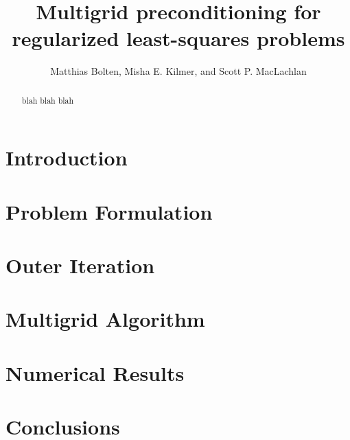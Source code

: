 \documentclass{article}
\title{Multigrid preconditioning for regularized least-squares problems}
\author{Matthias Bolten, Misha E. Kilmer, and Scott P. MacLachlan}
\begin{document}
\maketitle

\begin{abstract}
blah blah blah
\end{abstract}


\section{Introduction}


\section{Problem Formulation}


\section{Outer Iteration}


\section{Multigrid Algorithm}



\section{Numerical Results}


\section{Conclusions}

 
\end{document}

